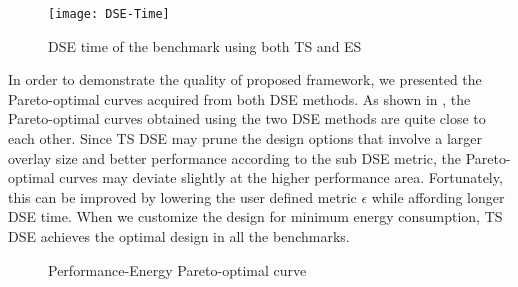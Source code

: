 \begin{figure}[tb]
    \centering
    \texttt{[image: DSE-Time]}
    \caption{DSE time of the benchmark using both TS and ES}
    \label{fig:DSE-Time}
\end{figure}


In order to demonstrate the quality of proposed framework, we presented the 
Pareto-optimal curves acquired from both DSE methods. As shown in , 
the Pareto-optimal curves obtained using the two DSE methods are quite 
close to each other. Since TS DSE may prune the design options that involve a larger 
overlay size and better performance according to the sub DSE metric, 
the Pareto-optimal curves may deviate slightly at the higher performance area. 
Fortunately, this can be improved by lowering the user defined metric $\epsilon$ 
while affording longer DSE time. When we customize the design for minimum energy 
consumption, TS DSE achieves the optimal design in all the benchmarks. 

\begin{figure}[tb]
    \centering
    \hfill
    \caption{Performance-Energy Pareto-optimal curve}
	\label{fig:DSE}
\end{figure}


